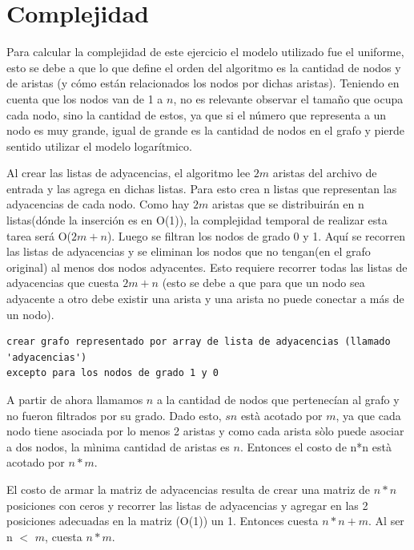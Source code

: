 \documentclass[a4paper,11pt] {article}
\begin{document}

\section*{Complejidad}

Para calcular la complejidad de este ejercicio el modelo utilizado fue el uniforme, esto se debe a que lo que define el orden del algoritmo es la cantidad de nodos y de aristas
(y cómo están relacionados los nodos  por dichas aristas). Teniendo en cuenta que los nodos van de 1 a $n$, no es relevante observar el tamaño que ocupa cada nodo, sino la cantidad de estos, ya que si el número que representa a un nodo es muy grande, igual de grande es la cantidad de nodos en el grafo y pierde sentido utilizar el modelo logarítmico.

\bigskip
Al crear las listas de adyacencias, el algoritmo lee $2m$ aristas del archivo de entrada y las agrega en dichas listas.  Para esto crea n listas que representan las adyacencias de cada nodo. Como hay $2m$ aristas que se distribuirán en n listas(dónde la inserción es en O(1)), la complejidad temporal de realizar esta tarea será O($2m + n$).
Luego se filtran los nodos de grado 0 y 1. Aquí se recorren las listas de adyacencias y  se eliminan los nodos que no tengan(en el grafo original) al menos dos nodos adyacentes. Esto requiere recorrer todas las listas de adyacencias que cuesta $2m + n$ (esto se debe a que para que un nodo sea adyacente a otro debe existir una arista y una arista no puede conectar a más de un nodo).

\begin{verbatim}
crear grafo representado por array de lista de adyacencias (llamado 'adyacencias')
excepto para los nodos de grado 1 y 0
\end{verbatim}

  A partir de ahora llamamos $n$ a la cantidad de nodos que pertenecían al grafo y no fueron filtrados por su grado. 
 Dado esto, $sn$  està acotado por  $m$, ya que cada nodo tiene asociada por lo menos 2 aristas y como cada arista sòlo puede asociar a dos nodos, la mìnima cantidad de aristas es $n$.
 Entonces el costo de n*n està acotado por $n*m$.

\bigskip

El costo de armar la matriz de adyacencias resulta de crear una matriz de $n*n$ posiciones con ceros y recorrer las listas de adyacencias y agregar en las 2 posiciones adecuadas en la matriz (O(1)) un 1.
Entonces cuesta $n*n + m$. Al ser n $<$ $m$, cuesta $n * m$.
\end{document}
